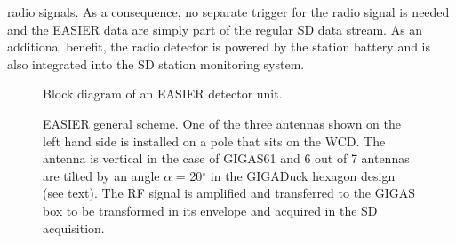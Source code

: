 radio signals.   As a consequence,  no separate trigger for  the radio
signal is needed and the EASIER data are simply part of the regular SD
data stream.  As an additional  benefit, the radio detector is powered
by  the station battery  and is  also integrated  into the  SD station
monitoring system.
\begin{figure}[!ht]
  \centering
  \hspace*{-3ex}  
  \caption{Block diagram of an EASIER detector unit.}
 \label{fig:diagram}  
\end{figure}
\begin{figure}[!ht]
  \centering
  \hspace*{-3ex}  
  \caption{EASIER general  scheme. One of the three  antennas shown on
    the left  hand side is installed on  a pole that sits  on the WCD.
    The antenna  is vertical  in the case  of \mbox{GIGAS61}  and 6 out  of 7
    antennas are  tilted by  an angle $\alpha$  = 20$^{\circ}$  in the
    GIGADuck hexagon design (see text). The RF signal is amplified and
    transferred to the GIGAS box to be transformed in its envelope and
    acquired in the SD acquisition.}
 \label{fig:easierscheme}  
\end{figure}
